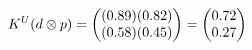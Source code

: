 \documentclass[preview]{standalone}
\begin{document}
\begin{align*}
\special{dvisvgm:raw <g id='unique000'>}K^U(d \otimes p) = \begin{pmatrix} (0.89)(0.82) \\ (0.58)(0.45) \end{pmatrix} = \begin{pmatrix} 0.72 \\ 0.27 \end{pmatrix}\special{dvisvgm:raw </g>}
\end{align*}
\end{document}
